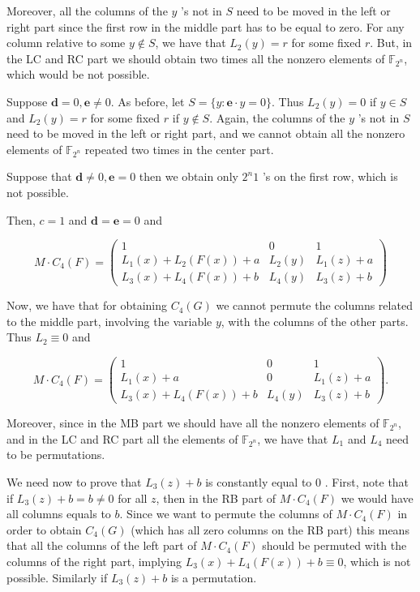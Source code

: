 \documentclass[10pt]{article}
\begin{document}
Moreover, all the columns of the $y$ 's not in $S$ need to be moved in the left or right part since the first row in the middle part has to be equal to zero. For any column relative to some $y \notin S$, we have that $L_{2}(y)=r$ for some fixed $r$. But, in the LC and RC part we should obtain two times all the nonzero elements of $\mathbb{F}_{2^{n}}$, which would be not possible.

Suppose $\mathbf{d}=0, \mathbf{e} \neq 0$. As before, let $S=\{y: \mathbf{e} \cdot y=0\}$. Thus $L_{2}(y)=0$ if $y \in S$ and $L_{2}(y)=r$ for some fixed $r$ if $y \notin S$. Again, the columns of the $y$ 's not in $S$ need to be moved in the left or right part, and we cannot obtain all the nonzero elements of $\mathbb{F}_{2^{n}}$ repeated two times in the center part.

Suppose that $\mathbf{d} \neq 0, \mathbf{e}=0$ then we obtain only $2^{n} 1$ 's on the first row, which is not possible.

Then, $c=1$ and $\mathbf{d}=\mathbf{e}=0$ and

$$
M \cdot C_{4}(F)=\left(\begin{array}{ccc}
1 & 0 & 1 \\
L_{1}(x)+L_{2}(F(x))+a & L_{2}(y) & L_{1}(z)+a \\
L_{3}(x)+L_{4}(F(x))+b & L_{4}(y) & L_{3}(z)+b
\end{array}\right)
$$

Now, we have that for obtaining $C_{4}(G)$ we cannot permute the columns related to the middle part, involving the variable $y$, with the columns of the other parts. Thus $L_{2} \equiv 0$ and

$$
M \cdot C_{4}(F)=\left(\begin{array}{ccc}
1 & 0 & 1 \\
L_{1}(x)+a & 0 & L_{1}(z)+a \\
L_{3}(x)+L_{4}(F(x))+b & L_{4}(y) & L_{3}(z)+b
\end{array}\right) .
$$

Moreover, since in the MB part we should have all the nonzero elements of $\mathbb{F}_{2^{n}}$, and in the LC and RC part all the elements of $\mathbb{F}_{2^{n}}$, we have that $L_{1}$ and $L_{4}$ need to be permutations.

We need now to prove that $L_{3}(z)+b$ is constantly equal to 0 . First, note that if $L_{3}(z)+b= b \neq 0$ for all $z$, then in the RB part of $M \cdot C_{4}(F)$ we would have all columns equals to $b$. Since we want to permute the columns of $M \cdot C_{4}(F)$ in order to obtain $C_{4}(G)$ (which has all zero columns on the RB part) this means that all the columns of the left part of $M \cdot C_{4}(F)$ should be permuted with the columns of the right part, implying $L_{3}(x)+L_{4}(F(x))+b \equiv 0$, which is not possible. Similarly if $L_{3}(z)+b$ is a permutation.
\end{document}
